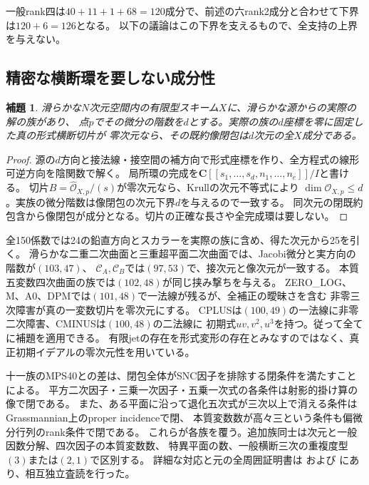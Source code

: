 \documentclass[a4paper,11pt]{ltjsarticle}
\newtheorem{lemma}[proposition]{補題}
\theoremstyle{definition}
\newcommand{\CC}{\mathbf C}
\begin{document}
一般rank四は$40+11+1+68=120$成分で、前述の六rank2成分と合わせて下界は$120+6=126$となる。
以下の議論はこの下界を支えるもので、全支持の上界を与えない。

\subsection{精密な横断環を要しない成分性}
\begin{lemma}\label{lem:transverse-support}
滑らかな$N$次元空間内の有限型スキーム$X$に、滑らかな源からの実際の解の族があり、
点$p$でその微分の階数を$d$とする。実際の族の$d$座標を零に固定した真の形式横断切片が
零次元なら、その既約像閉包は$d$次元の全$X$成分である。
\end{lemma}
\begin{proof}
源の$d$方向と接法線・接空間の補方向で形式座標を作り、全方程式の線形可逆方向を陰関数で解く。
局所環の完成を$\CC[[s_1,\ldots,s_d,n_1,\ldots,n_e]]/I$と書ける。
切片$B=\widehat{\mathcal O}_{X,p}/(s)$が零次元なら、Krullの次元不等式により
$\dim\mathcal O_{X,p}\le d$。実族の微分階数は像閉包の次元下界$d$を与えるので一致する。
同次元の閉既約包含から像閉包が成分となる。切片の正確な長さや全完成環は要しない。
\end{proof}

全150係数では24の鉛直方向とスカラーを実際の族に含め、得た次元から25を引く。
滑らかな二重二次曲面と三重超平面二次曲面では、Jacobi微分と実方向の階数が$(103,47)$、
$\mathcal C_A,\mathcal C_B$では$(97,53)$で、接次元と像次元が一致する。
本質五変数四次曲面の族では$(102,48)$が同じ挟み撃ちを与える。
ZERO\_LOG、M、A0、DPMでは$(101,48)$で一法線が残るが、全補正の曖昧さを含む
非零三次障害が真の一変数切片を零次元にする。
CPLUSは$(100,49)$の一法線に非零二次障害、CMINUSは$(100,48)$の二法線に
初期式$uv,v^2,u^3$を持つ。従って全てに補題を適用できる。
有限jetの存在を形式変形の存在とみなすのではなく、真正初期イデアルの零次元性を用いている。

十一族のMPS40との差は、閉包全体がSNC因子を排除する閉条件を満たすことによる。
平方二次因子・三乗一次因子・五乗一次式の各条件は射影的掛け算の像で閉である。
また、ある平面に沿って退化五次式が三次以上で消える条件はGrassmannian上のproper incidenceで閉、
本質変数数が高々三という条件も偏微分行列のrank条件で閉である。
これらが各族を覆う。追加族同士は次元と一般因数分解、四次因子の本質変数数、
特異平面の数、一般横断三次の重複度型$(3)$または$(2,1)$で区別する。
詳細な対応と元の全周囲証明書は
および
にあり、相互独立査読を行った。
\end{document}

